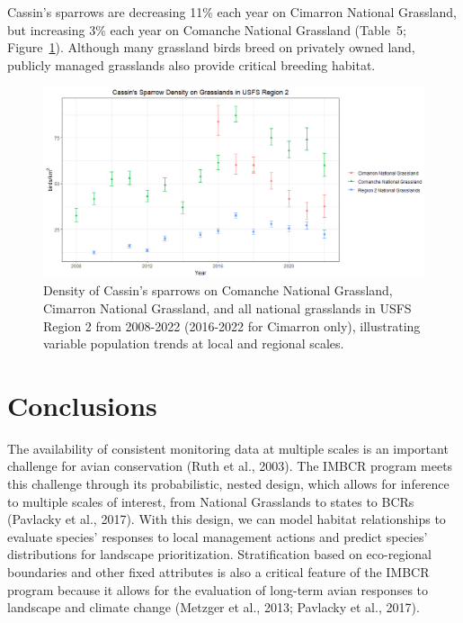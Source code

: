 \documentclass[
  letterpaper,
  DIV=11,
  numbers=noendperiod,
  oneside]{scrreprt}
\begin{document}
Cassin's sparrows are decreasing 11\% each year on Cimarron National
Grassland, but increasing 3\% each year on Comanche National Grassland
(Table~{5}; Figure~\ref{fig-usfs-grassland}). Although many grassland
birds breed on privately owned land, publicly managed grasslands also
provide critical breeding habitat.

\begin{figure}

{\centering \includegraphics{./USFS-grassland-density-trend.png}

}

\caption{\label{fig-usfs-grassland}Density of Cassin's sparrows on
Comanche National Grassland, Cimarron National Grassland, and all
national grasslands in USFS Region 2 from 2008-2022 (2016-2022 for
Cimarron only), illustrating variable population trends at local and
regional scales.}

\end{figure}

\hypertarget{conclusions}{%
\chapter{Conclusions}\label{conclusions}}

The availability of consistent monitoring data at multiple scales is an
important challenge for avian conservation (Ruth et al., 2003). The
IMBCR program meets this challenge through its probabilistic, nested
design, which allows for inference to multiple scales of interest, from
National Grasslands to states to BCRs (Pavlacky et al., 2017). With this
design, we can model habitat relationships to evaluate species'
responses to local management actions and predict species' distributions
for landscape prioritization. Stratification based on eco-regional
boundaries and other fixed attributes is also a critical feature of the
IMBCR program because it allows for the evaluation of long-term avian
responses to landscape and climate change (Metzger et al., 2013;
Pavlacky et al., 2017).
\end{document}
